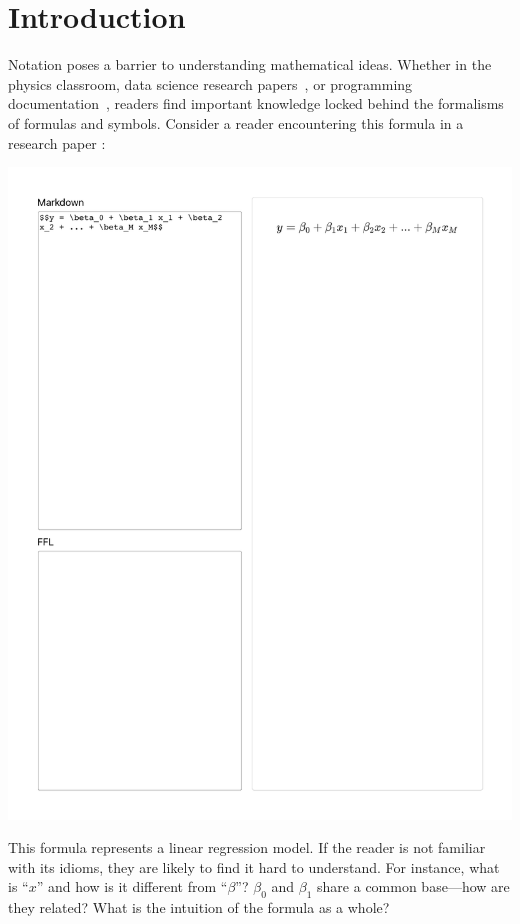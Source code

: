 \section{Introduction}

Notation poses a barrier to understanding mathematical ideas. Whether in the physics classroom, data science research papers~\cite{ref:mysore2023how}, or programming documentation~\cite{ref:cai2019software}, readers find important knowledge locked behind the formalisms of formulas and symbols. 
Consider a reader encountering this formula in a research paper \cite{ref:hohman2019gamut}:


\begin{center}
\vspace{1ex}
\includegraphics[width=0.62\linewidth]{fig/pre-aug-intro}
\end{center}
\vspace{-0.5ex}

This formula represents a linear regression model. If the reader is not familiar with its idioms, they are likely to find it hard to understand. For instance, what is ``$x$'' and how is it different from ``$\beta$''? $\beta_0$ and $\beta_1$ share a common base---how are they related? What is the intuition of the formula as a whole?

